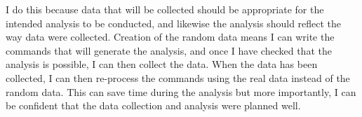 I do this because data that will  be collected should be appropriate for the intended analysis to be conducted, and likewise the analysis should reflect the way data were collected. Creation of the random data means I can write the \R{} commands that will generate the analysis, and once I have checked that the analysis is possible, I can then collect the data. When the data has been collected, I can then re-process the commands using the real data instead of the  random data. This can save time during the analysis but more importantly, I can be confident that the data collection and analysis were planned well. 
 
 


